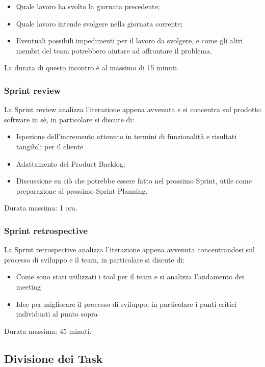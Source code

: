 \begin{itemize}
    \item Quale lavoro ha svolto la giornata precedente;
    \item Quale lavoro intende svolgere nella giornata corrente;
    \item Eventuali possibili impedimenti per il lavoro da svolgere, e come gli altri membri del team potrebbero aiutare ad affrontare il problema.
\end{itemize}
La durata di questo incontro è al massimo di 15 minuti.

\subsubsection{Sprint review}
La Sprint review analizza l'iterazione appena avvenuta e si concentra sul prodotto software in sè, in particolare si discute di:

\begin{itemize}
    \item Ispezione dell'incremento ottenuto in termini di funzionalità e risultati tangibili per il cliente
    \item Adattamento del Product Backlog;
    \item Discussione su ciò che potrebbe essere fatto nel prossimo Sprint, utile come pre\-pa\-ra\-zione al prossimo Sprint Planning.
\end{itemize}
Durata massima: 1 ora.

\subsubsection{Sprint retrospective}
La Sprint retrospective analizza l'iterazione appena avvenuta concentrandosi sul processo di sviluppo e il team, in particolare si discute di:

\begin{itemize}
    \item Come sono stati utilizzati i tool per il team e si analizza l'andamento dei meeting
    \item Idee per migliorare il processo di sviluppo, in particolare i punti critici individuati al punto sopra
\end{itemize}
Durata massima: 45 minuti.

\subsection{Divisione dei Task}

